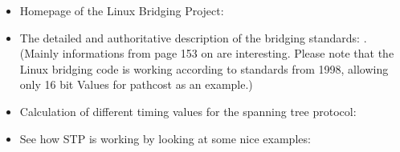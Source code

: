 \begin{itemize}
\item Homepage of the Linux Bridging Project:\hfil\break
      \hfil\break

\item The detailed and authoritative description of the bridging standards:\hfil\break
      .\hfil\break
      (Mainly informations from page 153 on are interesting. Please note that the 
       Linux bridging code is working according to standards from 1998, allowing 
       only 16 bit Values for pathcost as an example.)

\item Calculation of different timing values for the spanning tree protocol:\hfil\break
      \hfil\break

\item See how STP is working by looking at some nice examples:\hfil\break
      \hfil\break
\end{itemize}

